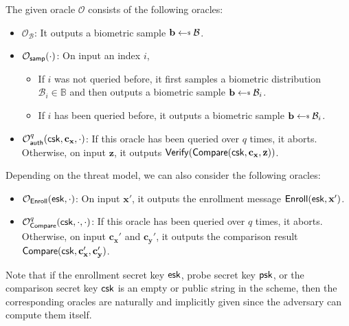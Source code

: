 The given oracle $\mathcal{O}$ consists of the following oracles:

\begin{itemize}
	\item $\mathcal{O}_{\mathcal{B}}$: It outputs a biometric sample $\mathbf{b} \getsdollar \mathcal{B}$.

	\item $\mathcal{O}_{\sf samp}(\cdot)$: On input an index $i$,
	\begin{itemize}
		\item If $i$ was not queried before, it first samples a biometric distribution $\mathcal{B}_i \in \mathbb{B}$ and then outputs a biometric sample $\mathbf{b} \getsdollar \mathcal{B}_i$.
		\item If $i$ has been queried before, it outputs a biometric sample $\mathbf{b} \getsdollar \mathcal{B}_i$.
	\end{itemize}

	\item $\mathcal{O}_{\sf auth}^{q}({\sf csk}, \mathbf{c_x}, \cdot)$: If this oracle has been queried over $q$ times, it aborts. Otherwise, on input $\mathbf{z}$, it outputs ${\sf Verify}({\sf Compare}({\sf csk}, \mathbf{c_x}, \mathbf{z}))$.
\end{itemize}

Depending on the threat model, we can also consider the following oracles:

\begin{itemize}
	\item $\mathcal{O}_{\sf Enroll}({\sf esk}, \cdot)$: On input $\mathbf{x'}$, it outputs the enrollment message ${\sf Enroll}({\sf esk}, \mathbf{x'})$.

	\item $\mathcal{O}_{\sf Compare}^q({\sf csk}, \cdot, \cdot)$: If this oracle has been queried over $q$ times, it aborts. Otherwise, on input $\mathbf{c_x'}$ and $\mathbf{c_y'}$, it outputs the comparison result ${\sf Compare}( {\sf csk}, \mathbf{c_x'}, \mathbf{c_y'} )$.

\end{itemize}

Note that if the enrollment secret key ${\sf esk}$, probe secret key ${\sf psk}$, or the comparison secret key ${\sf csk}$ is an empty or public string in the scheme, then the corresponding oracles are naturally and implicitly given since the adversary can compute them itself. 

